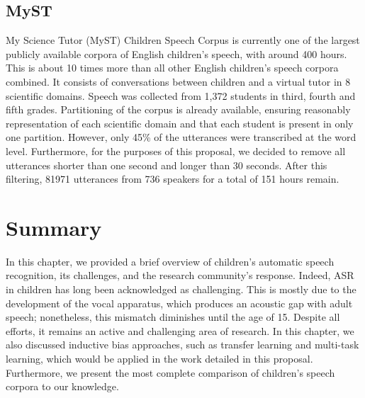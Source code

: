 \subsection{MyST}
My Science Tutor (MyST) Children Speech Corpus \cite{MyST} is currently one of the largest publicly available corpora of English children's speech, with around 400 hours. This is about 10 times more than all other English children's speech corpora combined. It consists of conversations between children and a virtual tutor in 8 scientific domains. Speech was collected from 1,372  students in third, fourth and fifth grades. Partitioning of the corpus is already available, ensuring reasonably representation of each scientific domain and that each student is present in only one partition. However, only 45\% of the utterances were transcribed at the word level. Furthermore, for the purposes of this proposal, we decided to remove all utterances shorter than one second and longer than 30 seconds. After this filtering, 81971 utterances from 736 speakers for a total of 151 hours remain.


\section{Summary}
In this chapter, we provided a brief overview of children's automatic speech recognition, its challenges, and the research community's response. Indeed, ASR in children has long been acknowledged as challenging. This is mostly due to the development of the vocal apparatus, which produces an acoustic gap with adult speech; nonetheless, this mismatch diminishes until the age of 15. Despite all efforts, it remains an active and challenging area of research. In this chapter, we also discussed inductive bias approaches, such as transfer learning and multi-task learning, which would be applied in the work detailed in this proposal. Furthermore, we present the most complete comparison of children's speech corpora to our knowledge.